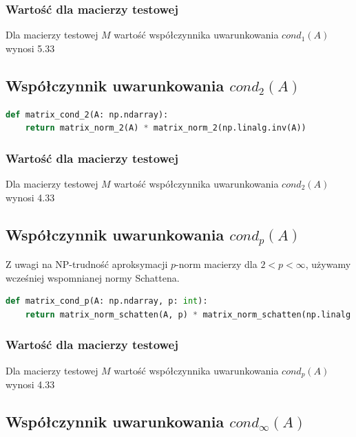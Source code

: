 \documentclass[a4paper]{article}
\begin{document}
\subsubsection{Wartość dla macierzy testowej}

Dla macierzy testowej $M$ wartość współczynnika uwarunkowania $cond_{1}(A)$ wynosi 5.33

\subsection{Współczynnik uwarunkowania $cond_2(A)$}

\begin{lstlisting}[language=python]
def matrix_cond_2(A: np.ndarray):
    return matrix_norm_2(A) * matrix_norm_2(np.linalg.inv(A))
\end{lstlisting}

\subsubsection{Wartość dla macierzy testowej}

Dla macierzy testowej $M$ wartość współczynnika uwarunkowania $cond_2(A)$ wynosi 4.33

\subsection{Współczynnik uwarunkowania $cond_p(A)$}

Z uwagi na NP-trudność aproksymacji $p$-norm macierzy dla $2 < p < \infty$, używamy wcześniej wspomnianej normy Schattena.

\begin{lstlisting}[language=python]
def matrix_cond_p(A: np.ndarray, p: int):
    return matrix_norm_schatten(A, p) * matrix_norm_schatten(np.linalg.inv(A), p)
\end{lstlisting}

\subsubsection{Wartość dla macierzy testowej}

Dla macierzy testowej $M$ wartość współczynnika uwarunkowania $cond_p(A)$ wynosi 4.33

\subsection{Współczynnik uwarunkowania $cond_{\infty}(A)$}
\end{document}
